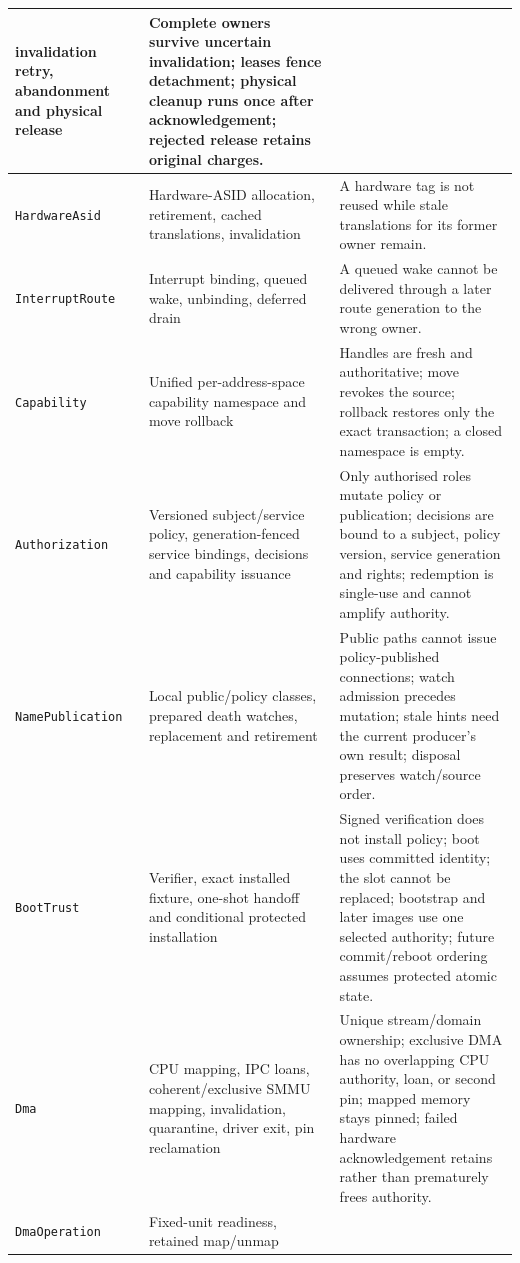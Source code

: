 \begin{longtable}{|p{}|p{}|p{}|}
    invalidation retry, abandonment and physical release & Complete owners
    survive uncertain invalidation; leases fence detachment; physical cleanup
    runs once after acknowledgement; rejected release retains original charges. \\
\hline
\texttt{HardwareAsid} & Hardware-ASID allocation, retirement, cached
    translations, invalidation & A hardware tag is not reused while stale
    translations for its former owner remain. \\
\hline
\texttt{InterruptRoute} & Interrupt binding, queued wake, unbinding,
    deferred drain & A queued wake cannot be delivered through a later route
    generation to the wrong owner. \\
\hline
\texttt{Capability} & Unified per-address-space capability namespace
    and move rollback & Handles are fresh and authoritative; move revokes the
    source; rollback restores only the exact transaction; a closed namespace
    is empty. \\
\hline
\texttt{Authorization} & Versioned subject/service policy,
    generation-fenced service bindings, decisions and capability issuance &
    Only authorised roles mutate policy or publication; decisions are bound to
    a subject, policy version, service generation and rights; redemption is
    single-use and cannot amplify authority. \\
\hline
\texttt{NamePublication} & Local public/policy classes, prepared
    death watches, replacement and retirement & Public paths cannot issue
    policy-published connections; watch admission precedes mutation; stale hints
    need the current producer's own result; disposal preserves watch/source order. \\
\hline
\texttt{BootTrust} & Verifier, exact installed fixture, one-shot
    handoff and conditional protected installation & Signed verification does
    not install policy; boot uses committed identity; the slot cannot be replaced;
    bootstrap and later images use one selected authority; future commit/reboot
    ordering assumes protected atomic state. \\
\hline
\texttt{Dma} & CPU mapping, IPC loans, coherent/exclusive SMMU
    mapping, invalidation, quarantine, driver exit, pin reclamation & Unique
    stream/domain ownership; exclusive DMA has no overlapping CPU authority,
    loan, or second pin; mapped memory stays pinned; failed hardware
    acknowledgement retains rather than prematurely frees authority. \\
\hline
\texttt{DmaOperation} & Fixed-unit readiness, retained map/unmap

\end{longtable}
